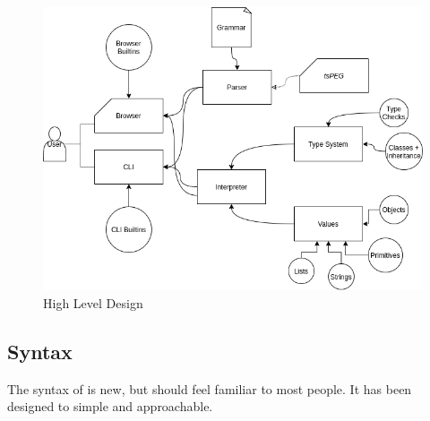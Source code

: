 \begin{figure}
    \caption{\Setanta{} High Level Design}
    \label{setantadiagram}
    \begin{center}
    \includegraphics[scale=0.5]{setantadiagram}
    \end{center}
\end{figure}

\subsection{Syntax}

The syntax of \Setanta{} is new, but should feel familiar to most people. It has been designed to simple and approachable.


